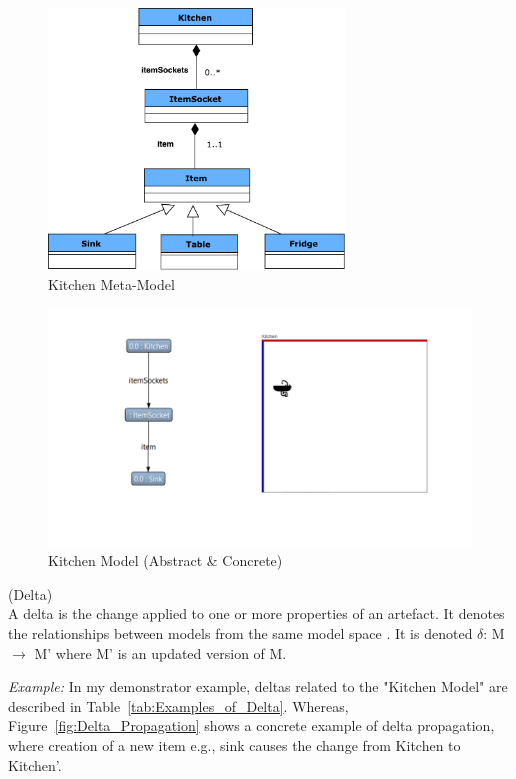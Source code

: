 \begin{figure}
	\includegraphics[width=0.7\textwidth]{figures/Kitchen_MetaModel}
	\caption{Kitchen Meta-Model}
	\label{fig:Kitchen_MetaModel}
\end{figure}

\begin{figure}
	\includegraphics[width=1\textwidth]{figures/Kitchen_AbstractConcrete}
	\caption{Kitchen Model (Abstract \& Concrete)}
	\label{fig:Kitchen_AbstractConcrete}
\end{figure}

\begin{defn}\label{defDelta} (Delta)\\
A delta is the change applied to one or more properties of an artefact. It denotes the relationships between models from the same model space \cite{benchmarx-reload}. It is denoted $\delta$: M $\longrightarrow$ M' where M' is an updated version of M.
\end{defn}

\textit{Example:} In my demonstrator example, deltas related to the "Kitchen Model" are described in Table~\ref{tab:Examples_of_Delta}. Whereas, Figure~\ref{fig:Delta_Propagation} shows a concrete example of delta propagation, where creation of a new item e.g., sink causes the change from Kitchen to Kitchen'.\\


